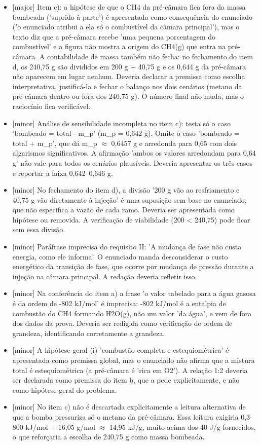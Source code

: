 \documentclass{article}%
\begin{document}
\begin{itemize}%
\item%
{[}major{]} Item c): a hipótese de que o CH4 da pré{-}câmara fica fora da massa bombeada ('suprido à parte') é apresentada como consequência do enunciado ('o enunciado atribui a ela só o combustível da câmara principal'), mas o texto diz que a pré{-}câmara recebe 'uma pequena porcentagem do combustível' e a figura não mostra a origem do CH4(g) que entra na pré{-}câmara. A contabilidade de massa também não fecha: no fechamento do item d, os 240,75 g são divididos em 200 g + 40,75 g e os 0,644 g da pré{-}câmara não aparecem em lugar nenhum. Deveria declarar a premissa como escolha interpretativa, justificá{-}la e fechar o balanço nos dois cenários (metano da pré{-}câmara dentro ou fora dos 240,75 g). O número final não muda, mas o raciocínio fica verificável.%
\item%
{[}minor{]} Análise de sensibilidade incompleta no item c): testa só o caso 'bombeado = total - m\_p' (m\_p = 0,642 g). Omite o caso 'bombeado = total + m\_p', que dá m\_p $\approx$ 0,6457 g e arredonda para 0,65 com dois algarismos significativos. A afirmação 'ambos os valores arredondam para 0,64 g' não vale para todos os cenários plausíveis. Deveria apresentar os três casos e reportar a faixa 0,642--0,646 g.%
\item%
{[}minor{]} No fechamento do item d), a divisão '200 g vão ao resfriamento e 40,75 g vão diretamente à injeção' é uma suposição sem base no enunciado, que não especifica a vazão de cada ramo. Deveria ser apresentada como hipótese ou removida. A verificação de viabilidade (200 < 240,75) pode ficar sem essa divisão.%
\item%
{[}minor{]} Paráfrase imprecisa do requisito II: 'A mudança de fase não custa energia, como ele informa'. O enunciado manda desconsiderar o custo energético da transição de fase, que ocorre por mudança de pressão durante a injeção na câmara principal. A redação deveria refletir isso.%
\item%
{[}minor{]} Na conferência do item a) a frase 'o valor tabelado para a água gasosa é da ordem de -802 kJ/mol' é imprecisa: -802 kJ/mol é a entalpia de combustão do CH4 formando H2O(g), não um valor 'da água', e vem de fora dos dados da prova. Deveria ser redigida como verificação de ordem de grandeza, identificando corretamente a grandeza.%
\item%
{[}minor{]} A hipótese geral (i) 'combustão completa e estequiométrica' é apresentada como premissa global, mas o enunciado não afirma que a mistura total é estequiométrica (a pré{-}câmara é 'rica em O2'). A relação 1:2 deveria ser declarada como premissa do item b, que a pede explicitamente, e não como hipótese geral do problema.%
\item%
{[}minor{]} No item c) não é descartada explicitamente a leitura alternativa de que a bomba pressuriza só o metano da pré{-}câmara. Essa leitura exigiria 0,3$\cdot$800 kJ/mol ÷ 16,05 g/mol $\approx$ 14,95 kJ/g, muito acima dos 40 J/g fornecidos, o que reforçaria a escolha de 240,75 g como massa bombeada.%
\end{itemize}%
\end{document}
